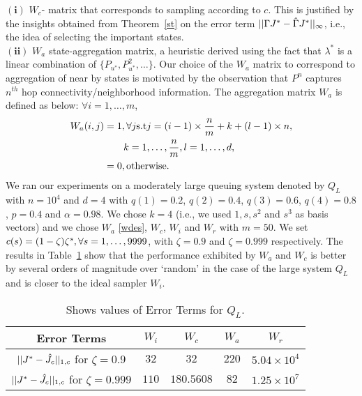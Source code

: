 {$\mathbf{(i)}$} $W_c$- matrix that corresponds to sampling according to $c$. This is justified by the insights obtained from Theorem~\ref{st} on the error term $||\Gamma J^*-\hat{\Gamma} J^*||_\infty$, i.e., the idea of selecting the important states.\\
{$\mathbf{(ii)}$} $W_a$ state-aggregation matrix, a heuristic derived using the fact that $\lambda^*$ is a linear combination of $\{P_{u^*},P^2_{u^*},\ldots\}$. Our choice of the $W_a$ matrix to correspond to aggregation of near by states is motivated by the observation that $P^n$ captures $n^{th}$ hop connectivity/neighborhood information.
The aggregation matrix $W_a$ is defined as below: $\forall i=1,\ldots,m$,
\begin{align}\label{wdes}
W_a(i,j)&=1, \mb\forall j\mb\text{s.t}\mb j=(i-1)\times\frac{n}{m}+k+(l-1)\times n, \nn\\&\mb\quad\quad k=1,\ldots,\frac{n}{m}, l=1,\ldots,d,\nn\\
&=0,\mb\text{otherwise}.
\end{align}
We ran our experiments on a moderately large queuing system denoted by $Q_L$ with $n=10^4$ and $d=4$ with $q(1)=0.2$, $q(2)=0.4$, $q(3)=0.6$, $q(4)=0.8$, $p=0.4$ and $\alpha=0.98$. We chose $k=4$ (i.e., we used $1, s,s^2$ and $s^3$ as basis vectors) and we chose $W_a$ \eqref{wdes}, $W_c$, $W_i$ and $W_r$ with $m=50$. We set $c(s)=(1-\zeta) \zeta^s, \relax{ }\forall s=1,\ldots,9999$, with $\zeta=0.9$ and $\zeta=0.999$ respectively. The results in Table~\ref{pref} show that the performance exhibited by $W_a$ and $W_c$ is better by several orders of magnitude over `random' in the case of the large system $Q_L$ and is closer to the ideal sampler $W_i$.
\FloatBarrier
\begin{table}[H]
\begin{center}
\begin{tabular}{|c|c|c|c|c|}\hline
Error Terms&	$W_i$&	$W_c$& $W_a$& $W_r$ \\\hline
$||J^*-\hat{J}_c||_{1,c}$ for $\zeta=0.9$& $32$&	$32$& $220$& $5.04\times 10^4$ \\\hline
$||J^*-\hat{J}_c||_{1,c}$ for $\zeta=0.999$& $110$&	$180.5608$& $82$& $1.25\times 10^7$ \\\hline
\end{tabular}
\end{center}
\caption{Shows values of Error Terms for $Q_L$.}
\label{pref}
\end{table}

